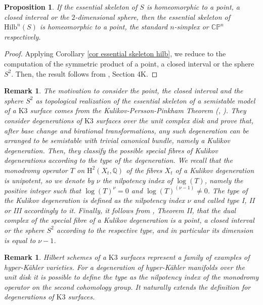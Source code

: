 \documentclass{amsart}%
\numberwithin{equation}{subsection}
\theoremstyle{plain2}
\newtheorem{prop}[equation]{Proposition}
\theoremstyle{definition2}
\newtheorem{rem}[equation]{Remark}
\theoremstyle{stepstyle}
\theoremstyle{point}
\theoremstyle{subpoint}
\newcommand{\Q}{\ensuremath{\mathbb{Q}}}
\newcommand{\CP}{\ensuremath{\mathbb{CP}}}
\newcommand{\Hilb}{\ensuremath{\mathrm{Hilb}}}
\begin{document}
{\begin{prop}
If the essential skeleton of $S$ is homeomorphic to a point, a closed interval or the $2$-dimensional sphere, then the essential skeleton of $\Hilb^n(S)$ is homeomorphic to a point, the standard $n$-simplex or $\CP^n$ respectively. 
\end{prop}
\begin{proof} Applying Corollary \ref{cor essential skeleton hilb}, we reduce to the computation of the symmetric product of a point, a closed interval or the sphere $S^2$. Then, the result follows from \cite{Hatcher}, Section 4K.
\end{proof}
\begin{rem}
The motivation to consider the point, the closed interval and the sphere $S^2$ as topological realization of the essential skeleton of a semistable model of a $\text{K}3$ surface comes from the Kulikov-Persson-Pinkham Theorem (\cite{Kulikov}, \cite{PerssonPinkham1981}). They consider degenerations of $\text{K}3$ surfaces over the unit complex disk and prove that, after base change and birational transformations, any such degeneration can be arranged to be semistable with trivial canonical bundle, namely a \emph{Kulikov degeneration}. Then, they classify the possible special fibres of Kulikov degenerations according to the type of the degeneration. We recall that the monodromy operator $T$ on $\text{H}^2(X_t, \Q)$ of the fibres $X_t$ of a Kulikov degeneration is unipotent, so we denote by $\nu$ the nilpotency index of $\log(T)$, namely the positive integer such that $\log(T)^\nu=0$ and $\log(T)^{(\nu-1)} \neq 0$. The type of the Kulikov degeneration is defined as the nilpotency index $\nu$ and called type I, II or III accordingly to it. Finally, it follows from \cite{Kulikov}, Theorem II, that the dual complex of the special fibre of a Kulikov degeneration is a point, a closed interval or the sphere $S^2$ according to the respective type, and in particular its dimension is equal to $\nu-1$.
\end{rem}
\begin{rem}
Hilbert schemes of a $\text{K}3$ surfaces represent a family of examples of hyper-K\"{a}hler varieties. For a degeneration of hyper-K\"{a}hler manifolds over the unit disk it is possible to define the type as the nilpotency index of the monodromy operator on the second cohomology group. It naturally extends the definition for degenerations of $\text{K}3$ surfaces.

\end{rem}}
\end{document}
